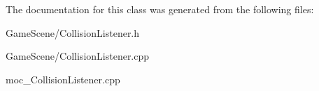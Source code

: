 The documentation for this class was generated from the following files\+:\begin{DoxyCompactItemize}
\item 
Game\+Scene/Collision\+Listener.\+h\item 
Game\+Scene/Collision\+Listener.\+cpp\item 
moc\+\_\+\+Collision\+Listener.\+cpp\end{DoxyCompactItemize}
